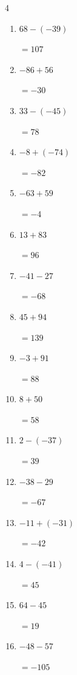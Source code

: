 \begin{multicols}{4}
\begin{enumerate}
        $=-112$

  \item $68-(-39)$

        $=107$

\columnbreak %

\resetques

  \item $-86+56$

        $=-30$

  \item $33-(-45)$

        $=78$

  \item $-8+(-74)$

        $=-82$

  \item $-63+59$

        $=-4$

  \item $13+83$

        $=96$

  \item $-41-27$

        $=-68$

  \item $45+94$

        $=139$

  \item $-3+91$

        $=88$

  \item $8+50$

        $=58$

  \item $2-(-37)$

        $=39$

  \item $-38-29$

        $=-67$

  \item $-11+(-31)$

        $=-42$

  \item $4-(-41)$

        $=45$

  \item $64-45$

        $=19$

  \item $-48-57$

        $=-105$


\end{enumerate}
\end{multicols}
